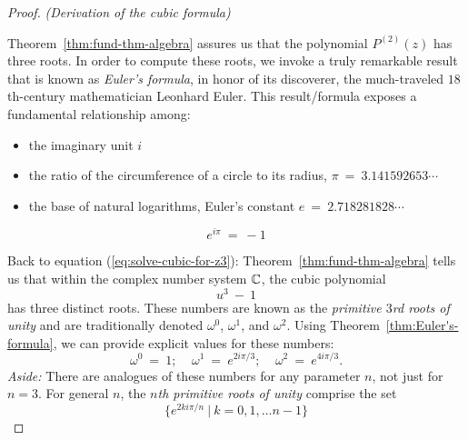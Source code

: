 \begin{proof} {\it (Derivation of the cubic formula)}
\medskip

 

Theorem~\ref{thm:fund-thm-algebra} assures us that the polynomial $P^{(2)}(z)$ has three roots.  In order to compute these roots, we invoke a truly remarkable result that is known as  {\it Euler's formula}, in honor of its discoverer, the much-traveled $18$th-century mathematician Leonhard Euler.  This result/formula exposes a fundamental relationship among:
\begin{itemize}
\item
the imaginary unit  $i$
\item
the ratio of the circumference of a circle to its radius, $\pi \ = \ 3.141592653 \cdots$
\item
the base of natural logarithms, Euler's constant $e \ = \ 2.718281828 \cdots$
\end{itemize}

\begin{theorem}
\label{thm:Euler's-formula}
\[ e^{i \pi} \ = \ -1 \]
\end{theorem}

\smallskip

  
Back to equation (\ref{eq:solve-cubic-for-z3}): Theorem~\ref{thm:fund-thm-algebra} tells us that within the complex number system $\mathbb{C}$, the cubic polynomial
\[ u^3 \ - \ 1 \]
has three distinct roots.  These numbers are known as the {\em primitive $3$rd roots of unity}  and are traditionally denoted $\omega^0$, $\omega^1$, and $\omega^2$.  Using Theorem~\ref{thm:Euler's-formula}, we can provide explicit values for these numbers:
\[ \omega^0 \ = \ 1; \ \ \ \ \
\omega^1 \ = \ e^{2i \pi/3}; \ \ \ \ \
\omega^2 \ = \ e^{4i \pi/3}.
\]
{\em Aside:} There are analogues of these numbers for any parameter $n$, not just for $n=3$.  For general $n$, the {\it $n$th primitive roots of unity} comprise the set
\[ \{ e^{2ki \pi/n} \ | \ k = 0, 1, \ldots n-1\} \]

\medskip


\end{proof}
